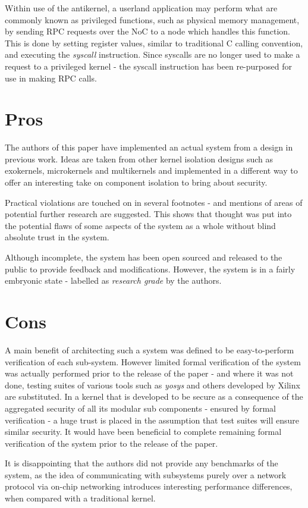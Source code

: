 \documentclass{article}
\begin{document}
Within use of the antikernel, a userland application may perform what are commonly known as privileged functions, such as physical memory management, by sending RPC requests over the NoC to a node which handles this function. This is done by setting register values, similar to traditional C calling convention, and executing the \textit{syscall} instruction. Since syscalls are no longer used to make a request to a privileged kernel - the syscall instruction has been re-purposed for use in making RPC calls.

\section*{Pros}
The authors of this paper have implemented an actual system from a design in previous work. Ideas are taken from other kernel isolation designs such as exokernels, microkernels and multikernels and implemented in a different way to offer an interesting take on component isolation to bring about security.

Practical violations are touched on in several footnotes - and mentions of areas of potential further research are suggested. This shows that thought was put into the potential flaws of some aspects of the system as a whole without blind absolute trust in the system.

Although incomplete, the system has been open sourced and released to the public to provide feedback and modifications. However, the system is in a fairly embryonic state - labelled as \textit{research grade} by the authors.

\section*{Cons}
A main benefit of architecting such a system was defined to be easy-to-perform verification of each sub-system. However limited formal verification of the system was actually performed prior to the release of the paper - and where it was not done, testing suites of various tools such as \textit{yosys} and others developed by Xilinx are substituted.
In a kernel that is developed to be secure as a consequence of the aggregated security of all its modular sub components - ensured by formal verification - a huge trust is placed in the assumption that test suites will ensure similar security. It would have been beneficial to complete remaining formal verification of the system prior to the release of the paper.

It is disappointing that the authors did not provide any benchmarks of the system, as the idea of communicating with subsystems purely over a network protocol via on-chip networking introduces interesting performance differences, when compared with a traditional kernel.
\end{document}
